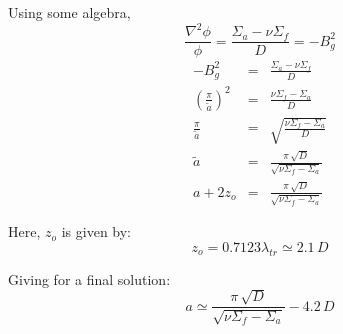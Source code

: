 \begin{questions}
{{\begin{solution}
Using some algebra, $$\displaystyle \frac{\nabla^2\phi}{\phi} = \frac{\Sigma_a-\nu\Sigma_f}{D}  = -B_g^2$$
\begin{eqnarray*}
-B_g^2 & = &\frac{\Sigma_a-\nu\Sigma_f}{D}\\
\left(\frac{\pi}{\tilde{a}}\right)^2 & = &\frac{\nu\Sigma_f-\Sigma_a}{D}\\
\frac{\pi}{\tilde{a}} & = &\sqrt{\frac{\nu\Sigma_f-\Sigma_a}{D}}\\
\tilde{a} & = & \frac{\pi\, \sqrt{D}}{\sqrt{\nu\Sigma_f-\Sigma_a}}\\
a + 2 z_o & = & \frac{\pi\, \sqrt{D}}{\sqrt{\nu\Sigma_f-\Sigma_a}}
\end{eqnarray*}

Here, $z_o$ is given by:
$$\displaystyle z_o = 0.7123\lambda_{tr} \simeq 2.1\,D$$

Giving for a final solution:
$$ a \simeq \frac{\pi\, \sqrt{D}}{\sqrt{\nu\Sigma_f-\Sigma_a}} - 4.2\,D$$
\end{solution}}}
\ifprintanswers
\pagebreak
\fi
{}
\end{questions}

